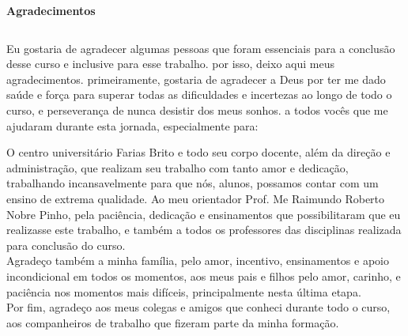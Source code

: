 \begin{center}
\textbf{Agradecimentos}
\end{center}

$\!$\\
$\!$\\
\begin{flushright}
\parbox{0.65\linewidth}{
\itshape \flushright

Eu gostaria de agradecer algumas pessoas que foram essenciais para a conclusão desse curso e inclusive para esse trabalho. por isso, deixo aqui meus agradecimentos. 
primeiramente, gostaria de agradecer a Deus por ter me dado saúde e força para superar todas as dificuldades e incertezas ao longo de todo o curso, e perseverança de nunca desistir dos meus sonhos. a todos vocês que me ajudaram durante esta jornada, especialmente para:
\vspace{0.5cm}

O centro universitário Farias Brito e todo seu corpo docente, além da direção e administração, que realizam seu trabalho com tanto amor e dedicação, trabalhando incansavelmente para que nós, alunos, possamos contar com um ensino de extrema qualidade.
Ao meu orientador Prof. Me Raimundo Roberto Nobre Pinho, pela paciência, dedicação e ensinamentos que possibilitaram que eu realizasse este trabalho, e também a todos os professores das disciplinas realizada para conclusão do curso.\\
\vspace{0.5cm}
Agradeço também a minha família, pelo amor, incentivo, ensinamentos e apoio incondicional em todos os momentos, aos meus pais e filhos pelo amor, carinho, e paciência nos momentos mais difíceis, principalmente nesta última etapa.\\
\vspace{0.5cm}
Por fim, agradeço aos meus colegas e amigos que conheci durante todo o curso, aos companheiros de trabalho que fizeram parte da minha formação.\\
}
\end{flushright}
